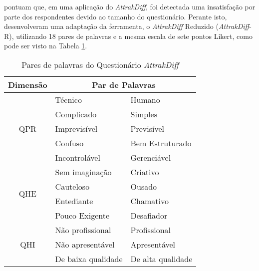  pontuam que, em uma aplicação do \textit{AttrakDiff}, foi detectada uma insatisfação por parte dos respondentes devido ao tamanho 
do questionário. Perante isto, desenvolveram uma adaptação da ferramenta, o \textit{AttrakDiff} Reduzido (\textit{AttrakDiff}-R), utilizando 18 pares de palavras e a mesma 
escala de sete pontos Likert, como pode ser visto na Tabela \ref{tab02}.

\begin{table}[h]
    \centering
    \caption{Pares de palavras do Questionário \textit{AttrakDiff}}
    \begin{adjustbox}{center}
    \label{tab02}
    \begin{tabular}{c|ll}
    \hline
    \textbf{Dimensão}             & \multicolumn{2}{c}{\textbf{Par de Palavras}}                                 \\ \hline
    \multirow{5}{*}{QPR} & \multicolumn{1}{l|}{Técnico}                 & Humano                \\ \cline{2-3} 
                         & \multicolumn{1}{l|}{Complicado}              & Simples               \\ \cline{2-3} 
                         & \multicolumn{1}{l|}{Imprevisível}            & Previsível            \\ \cline{2-3} 
                         & \multicolumn{1}{l|}{Confuso}                 & Bem Estruturado       \\ \cline{2-3} 
                         & \multicolumn{1}{l|}{Incontrolável}           & Gerenciável           \\ \hline
    \multirow{4}{*}{QHE} & \multicolumn{1}{l|}{Sem imaginação}          & Criativo              \\ \cline{2-3} 
                         & \multicolumn{1}{l|}{Cauteloso}               & Ousado                \\ \cline{2-3} 
                         & \multicolumn{1}{l|}{Entediante}              & Chamativo             \\ \cline{2-3} 
                         & \multicolumn{1}{l|}{Pouco Exigente}          & Desafiador            \\ \hline
    \multirow{5}{*}{QHI} & \multicolumn{1}{l|}{Não profissional}        & Profissional          \\ \cline{2-3} 
                         & \multicolumn{1}{l|}{Não apresentável}        & Apresentável          \\ \cline{2-3} 
                         & \multicolumn{1}{l|}{De baixa qualidade}      & De alta qualidade     \\ \cline{2-3} 

\end{tabular}
\end{adjustbox}
\end{table}
